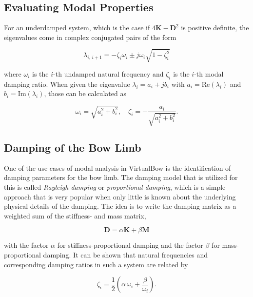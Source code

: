 \subsection{Evaluating Modal Properties}

For an underdamped system, which is the case if $4\boldsymbol{K} - \boldsymbol{D}^2$ is positive definite, the eigenvalues come in complex conjugated pairs of the form \cite{bib:li95}

\begin{equation}
\lambda_{i,\,i+1} = -\zeta_{i}\omega_{i} \pm j\omega_{i}\sqrt{1 - \zeta_{i}^2}
\end{equation}

where $\omega_{i}$ is the $i$-th undamped natural frequency and $\zeta_{i}$ is the $i$-th modal damping ratio.
When given the eigenvalue $\lambda_{i} = a_{i} + jb_{i}$ with $a_{i} = \mathrm{Re}(\lambda_i)$ and $b_{i} = \mathrm{Im}(\lambda_i)$, those can be calculated as

\begin{equation}
\omega_{i} = \sqrt{a_{i}^2 + b_{i}^2}, \quad \zeta_{i} = -\frac{a_{i}}{\sqrt{a_{i}^2 + b_{i}^2}}.
\end{equation}

\subsection{Damping of the Bow Limb}
\label{sec:rayleigh-damping}

One of the use cases of modal analysis in VirtualBow is the identification of damping parameters for the bow limb.
The damping model that is utilized for this is called \textit{Rayleigh damping} or \textit{proportional damping}, which is a simple approach that is very popular when only little is known about the underlying physical details of the damping.
The idea is to write the damping matrix as a weighted sum of the stiffness- and mass matrix,

\begin{equation}
\boldsymbol{D} = \alpha\boldsymbol{K} + \beta\boldsymbol{M}
\end{equation}

with the factor $\alpha$ for stiffness-proportional damping and the factor $\beta$ for mass-proportional damping.
It can be shown \cite{bib:rayleigh-damping} that natural frequencies and corresponding damping ratios in such a system are related by 

\begin{equation}
\zeta_{i} = \frac{1}{2}\left(\alpha\,\omega_{i} + \frac{\beta}{\omega_{i}}\right).
\end{equation}

